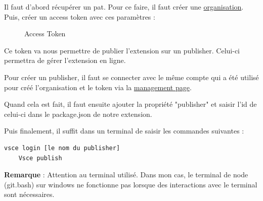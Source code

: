 \documentclass[
    iict, %
    il, %
]{heig-tb}
\begin{document}
Il faut d'abord récupérer un \Gls{pat}. Pour ce faire, il faut créer une \href{https://docs.microsoft.com/en-us/azure/devops/organizations/accounts/create-organization?view=azure-devops}{organisation}.
Puis, créer un access token avec ces paramètres :
\begin{figure}[!h]
    \begin{center}
    \end{center}
    \caption[Access Token]{\label{access-token}Access Token}
\end{figure}

Ce token va nous permettre de publier l'extension sur un publisher. Celui-ci permettra de gérer l'extension en ligne.

Pour créer un publisher, il faut se connecter avec le même compte qui a été utilisé pour créé l'organisation et le token via la \href{https://marketplace.visualstudio.com/manage/publishers/}{management page}.

Quand cela est fait, il faut ensuite ajouter la propriété "publisher" et saisir l'id de celui-ci dans le package.json de notre extension.

Puis finalement, il suffit dans un terminal de saisir les commandes suivantes :
\begin{lstlisting}[frame=single]
    vsce login [le nom du publisher]
    Vsce publish
\end{lstlisting}

\textbf{Remarque} : Attention au terminal utilisé. Dans mon cas, le terminal de node (git.bash) sur windows ne fonctionne pas lorsque des interactions avec le terminal sont nécessaires.
\end{document}
